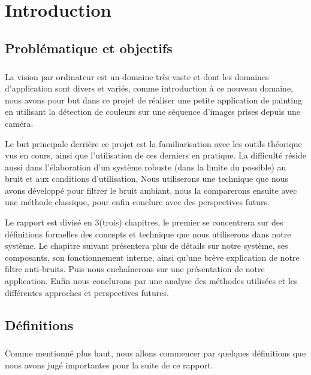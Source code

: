 \documentclass[12pt]{report}
\begin{document}
 
\tableofcontents
\listoffigures
\listoftables


\newpage

\chapter{Introduction}
	\section{Problématique et objectifs }
	\paragraph{}
	La vision par ordinateur est un domaine très vaste et dont les domaines d'application sont
	divers et variés, comme introduction à ce nouveau domaine, nous avons pour but dans ce projet
	de réaliser une petite application de painting en utilisant la détection de couleurs sur une 
	séquence d'images prises depuis une caméra.
	\par 
	Le but principale derrière ce projet est la familiarisation avec les outils théorique vus en cours,
	ainsi que l'utilisation de ces derniers en pratique. La difficulté réside aussi dans l'élaboration
	d'un système robuste (dans la limite du possible) au bruit et aux conditions d'utilisation, Nous
	utiliserons une technique que nous avons développé pour filtrer le bruit ambiant, nous la 
	comparerons ensuite avec une méthode classique, pour enfin conclure avec des perspectives futurs.
	\par 
	Le rapport est divisé en 3(trois) chapitres, le premier se concentrera sur des définitions formelles
	des concepts et technique que nous utiliserons dans notre système. Le chapitre suivant présentera
	plus de détails sur notre système, ses composants, son fonctionnement interne, ainsi qu'une brève
	explication de notre filtre anti-bruits. Puis nous enchaînerons sur une présentation de notre
	application. Enfin nous conclurons par une analyse des méthodes utilisées et les différentes 
	approches et perspectives futures.
	
	\section{Définitions}
	\paragraph{}
	Comme mentionné plus haut, nous allons commencer par quelques définitions que nous avons jugé 
	importantes pour la suite de ce rapport.
	
\end{document}

